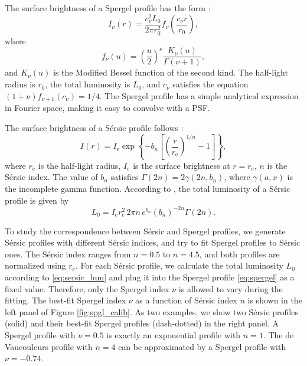\documentclass[twocolumn,astrosymb,twocolappendix]{aastex631}
\newcommand{\sersic}{S\'ersic}
\begin{document}
\begin{CJK*}{UTF8}{gbsn}
The surface brightness of a Spergel profile has the form \citep{Spergel2010}:
\begin{equation}
    \label{eq:spergel}
    I_\nu(r) = \frac{c_{\nu}^{2} L_{0}}{2\pi r_{0}^{2}} f_{\nu}\left(\frac{c_{\nu} r}{r_{0}}\right),
\end{equation}
where 
\begin{equation}
    f_{\nu}(u)=\left(\frac{u}{2}\right)^{\nu} \frac{K_{\nu}(u)}{\Gamma(\nu+1)},
\end{equation}
and $K_\nu(u)$ is the Modified Bessel function of the second kind. The half-light radius is $r_0$, the total luminosity is $L_0$, and $c_\nu$ satisfies the equation $(1 + \nu)f_{\nu + 1}(c_\nu) = 1/4$. The Spergel profile has a simple analytical expression in Fourier space, making it easy to convolve with a PSF.

The surface brightness of a \sersic{} profile follows \citep{Sersic1963,Graham2005}:
\begin{equation}\label{eq:sersic}
    I(r)=I_{\mathrm{e}} \exp \left\{-b_{n}\left[\left(\frac{r}{r_{\mathrm{e}}}\right)^{1 / n}-1\right]\right\},
\end{equation}
where $r_e$ is the half-light radius, $I_e$ is the surface brightness at $r=r_e$, $n$ is the \sersic{} index. The value of $b_n$ satisfies $\Gamma(2 n)=2 \gamma\left(2 n, b_{n}\right)$, where $\gamma(a, x)$ is the incomplete gamma function. According to \citet{Graham2005}, the total luminosity of a \sersic{} profile is given by 
\begin{equation}\label{eq:sersic_lum}
    L_0 = I_{e} r_{e}^{2}\, 2 \pi n\, e^{b_{n}} \left(b_{n}\right)^{-2 n} \Gamma(2 n).
\end{equation}

To study the correspondence between \sersic{} and Spergel profiles, we generate \sersic{} profiles with different \sersic{} indices, and try to fit Spergel profiles to \sersic{} ones. The \sersic{} index ranges from $n=0.5$ to $n=4.5$, and both profiles are normalized using $r_e$. For each \sersic{} profile, we calculate the total luminosity $L_0$ according to \eqref{eq:sersic_lum} and plug it into the Spergel profile \eqref{eq:spergel} as a fixed value. Therefore, only the Spergel index $\nu$ is allowed to vary during the fitting. The best-fit Spergel index $\nu$ as a function of \sersic{} index $n$ is shown in the left panel of Figure \ref{fig:spgl_calib}. As two examples, we show two \sersic{} profiles (solid) and their best-fit Spergel profiles (dash-dotted) in the right panel. A Spergel profile with $\nu=0.5$ is exactly an exponential profile with $n=1$. The de Vaucouleurs profile \citep{deVaucouleurs1948} with $n=4$ can be approximated by a Spergel profile with $\nu=-0.74$. 


\end{CJK*}
\end{document}
